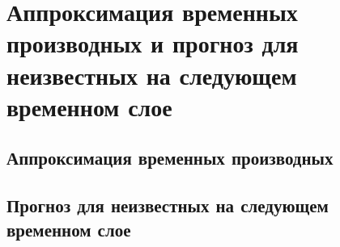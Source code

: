 
\section{Аппроксимация временных производных и прогноз для неизвестных на следующем временном слое}
\label{sec:section3}
\subsection{Аппроксимация временных производных}	


\subsection{Прогноз для неизвестных на следующем временном слое}

\newpage


   





















